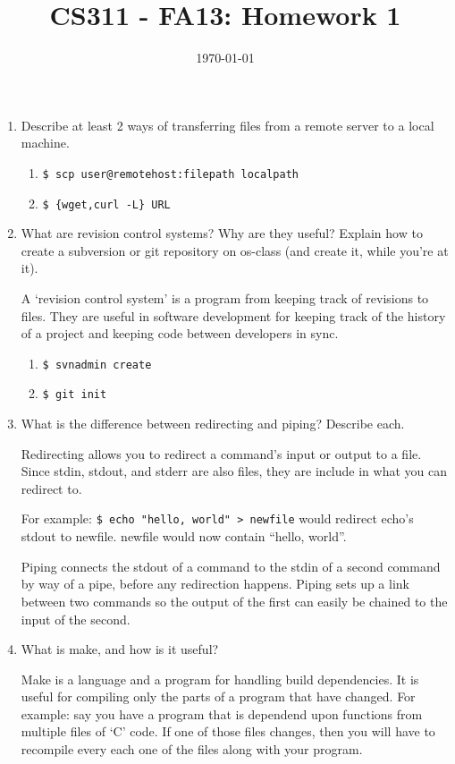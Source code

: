 \documentclass[letterpaper,10pt]{article}
\title{CS311 - FA13: Homework 1}
\date{\today}
\author{\name}
\begin{document}
\maketitle

\begin{enumerate}
\item Describe at least 2 ways of transferring files from a remote
      server to a local machine.
    \begin{enumerate}
        \item \texttt{\$ scp user@remotehost:filepath localpath}
        \item \texttt{\$ \{wget,curl -L\} URL}
    \end{enumerate}

\item What are revision control systems? Why are they useful? Explain
      how to create a subversion or git repository on os-class (and create
      it, while you're at it).

A `revision control system' is a program from keeping track of revisions
to files. They are useful in software development for keeping track of
the history of a project and keeping code between developers in sync.

    \begin{enumerate}
        \item \texttt{\$ svnadmin create}
        \item \texttt{\$ git init}
    \end{enumerate}

\item What is the difference between redirecting and piping? Describe each.

Redirecting allows you to redirect a command's input or output to a
file. Since stdin, stdout, and stderr are also files,
they are include in what you can redirect to.

For example:
    \texttt{\$ echo "hello, world" > newfile}
would redirect echo's stdout to newfile. newfile would now contain
``hello, world''.

Piping connects the stdout of a command to the stdin of a second
command by way of a pipe, before any redirection happens. Piping sets up
a link between two commands so the output of the first can easily be
chained to the input of the second.

\item What is make, and how is it useful?

Make is a language and a program for handling build dependencies.
It is useful for compiling only the parts of a program that have
changed. For example: say you have a program that is dependend upon
functions from multiple files of `C' code. If one of those files
changes, then you will have to recompile every each one of the files
along with your program. 


\end{enumerate}
\end{document}
